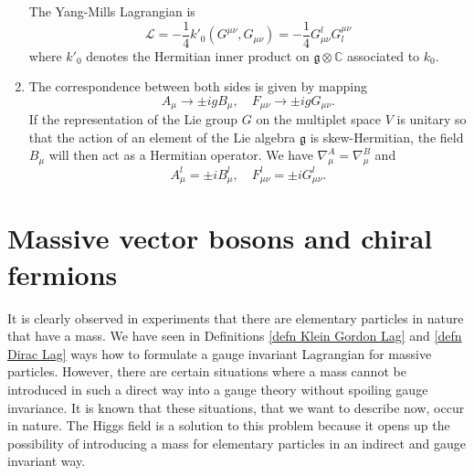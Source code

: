 \documentclass[12pt]{amsart}
\theoremstyle{definition}
\theoremstyle{remark}
\numberwithin{equation}{section}
\begin{document}
\begin{enumerate}
\begin{equation*}
\end{equation*}
The Yang-Mills Lagrangian is
\begin{equation*}
\mathcal{L}=-\frac{1}{4}k'_0(G^{\mu\nu},G_{\mu\nu})=-\frac{1}{4}G_{\mu\nu}^lG^{\mu\nu}_l
\end{equation*}
where $k'_0$ denotes the Hermitian inner product on $\mathfrak{g}\otimes\mathbb{C}$ associated to $k_0$.
\item The correspondence between both sides is given by mapping
\begin{equation*}
A_\mu\rightarrow \pm igB_\mu,\quad F_{\mu\nu}\rightarrow \pm igG_{\mu\nu}.
\end{equation*}
If the representation of the Lie group $G$ on the multiplet space $V$ is unitary so that the action of an element of the Lie algebra $\mathfrak{g}$ is skew-Hermitian, the field $B_\mu$ will then act as a Hermitian operator. We have $\nabla^A_\mu=\nabla^B_\mu$ and
\begin{equation*}
A_\mu^l=\pm iB_\mu^l,\quad F_{\mu\nu}^l=\pm iG_{\mu\nu}^l.
\end{equation*}
\end{enumerate}





\section{Massive vector bosons and chiral fermions}\label{sect massive boson chiral fermion}

It is clearly observed in experiments that there are elementary particles in nature that have a mass. We have seen in Definitions \ref{defn Klein Gordon Lag} and \ref{defn Dirac Lag} ways how to formulate a gauge invariant Lagrangian for massive particles. However, there are certain situations where a mass cannot be introduced in such a direct way into a gauge theory without spoiling gauge invariance. It is known that these situations, that we want to describe now, occur in nature. The Higgs field is a solution to this problem because it opens up the possibility of introducing a mass for elementary particles in an indirect and gauge invariant way.
\end{document}
